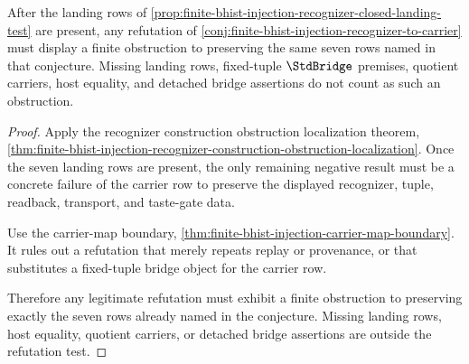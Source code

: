 \begin{theorem}
\label{thm:finite-bhist-injection-carrier-row-refutation-test}
After the landing rows of \autoref{prop:finite-bhist-injection-recognizer-closed-landing-test} are present, any refutation of \autoref{conj:finite-bhist-injection-recognizer-to-carrier} must display a finite obstruction to preserving the same seven rows named in that conjecture. Missing landing rows, fixed-tuple $\StdBridge$ premises, quotient carriers, host equality, and detached bridge assertions do not count as such an obstruction.
\end{theorem}
\begin{proof}
Apply the recognizer construction obstruction localization theorem, \autoref{thm:finite-bhist-injection-recognizer-construction-obstruction-localization}. Once the seven landing rows are present, the only remaining negative result must be a concrete failure of the carrier row to preserve the displayed recognizer, tuple, readback, transport, and taste-gate data.

Use the carrier-map boundary, \autoref{thm:finite-bhist-injection-carrier-map-boundary}. It rules out a refutation that merely repeats replay or provenance, or that substitutes a fixed-tuple bridge object for the carrier row.

Therefore any legitimate refutation must exhibit a finite obstruction to preserving exactly the seven rows already named in the conjecture. Missing landing rows, host equality, quotient carriers, or detached bridge assertions are outside the refutation test.
\end{proof}

